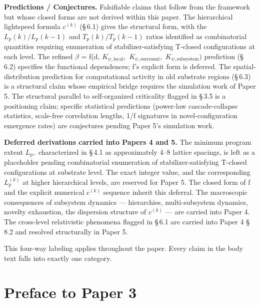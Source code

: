 \documentclass[11pt,oneside]{report}
\theoremstyle{definition}
\theoremstyle{remark}
\begin{document}
\textbf{Predictions / Conjectures.} Falsifiable claims that follow from
the framework but whose closed forms are not derived within this paper.
The hierarchical lightspeed formula \ensuremath{c^{(k)}} (\S\,6.1) gives the structural
form, with the \ensuremath{L_{p}(k)/L_{p}(k-1)} and \ensuremath{T_{p}(k)/T_{p}(k-1)} ratios identified
as combinatorial quantities requiring enumeration of
stabilizer-satisfying T-closed configurations at each level. The refined
\ensuremath{\beta} = f(d, \ensuremath{K_{\psi,\mathrm{local}},} \ensuremath{K_{\psi,\mathrm{surround}},} \ensuremath{K_{\psi,\mathrm{subsystem}})} prediction (\S\,6.2)
specifies the functional dependences; f's explicit form is deferred. The
spatial-distribution prediction for computational activity in old
substrate regions (\S\,6.3) is a structural claim whose empirical bridge
requires the simulation work of Paper 5. The structural parallel to
self-organized criticality flagged in \S\,3.5 is a positioning claim;
specific statistical predictions (power-law cascade-collapse statistics,
scale-free correlation lengths, 1/f signatures in novel-configuration
emergence rates) are conjectures pending Paper 5's simulation work.

\textbf{Deferred derivations carried into Papers 4 and 5.} The minimum
program extent \ensuremath{L_{p},} characterized in \S\,4.1 as approximately 4--8 lattice
spacings, is left as a placeholder pending combinatorial enumeration of
stabilizer-satisfying T-closed configurations at substrate level. The
exact integer value, and the corresponding \ensuremath{L_{p}^{(k)}} at higher
hierarchical levels, are reserved for Paper 5. The closed form of f and
the explicit numerical \ensuremath{c^{(k)}} sequence inherit this deferral. The
macroscopic consequences of subsystem dynamics --- hierarchies,
multi-subsystem dynamics, novelty exhaustion, the dispersion structure
of \ensuremath{c^{(k)}} --- are carried into Paper 4. The cross-level relativistic
phenomena flagged in \S\,6.1 are carried into Paper 4 \S\,8.2 and resolved
structurally in Paper 5.

This four-way labeling applies throughout the paper. Every claim in the
body text falls into exactly one category.

\section*{Preface to Paper 3}
\end{document}
